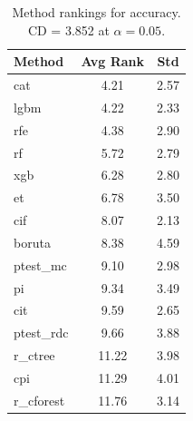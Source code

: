 \begin{table}[h]
\centering
\caption{Method rankings for accuracy. CD = 3.852 at $\alpha=0.05$.}
\label{tab:ranks_accuracy}
\begin{tabular}{lcc}
\toprule
Method & Avg Rank & Std \\
\midrule
cat & 4.21 & 2.57 \\
lgbm & 4.22 & 2.33 \\
rfe & 4.38 & 2.90 \\
rf & 5.72 & 2.79 \\
xgb & 6.28 & 2.80 \\
et & 6.78 & 3.50 \\
cif & 8.07 & 2.13 \\
boruta & 8.38 & 4.59 \\
ptest_mc & 9.10 & 2.98 \\
pi & 9.34 & 3.49 \\
cit & 9.59 & 2.65 \\
ptest_rdc & 9.66 & 3.88 \\
r_ctree & 11.22 & 3.98 \\
cpi & 11.29 & 4.01 \\
r_cforest & 11.76 & 3.14 \\
\bottomrule
\end{tabular}
\end{table}